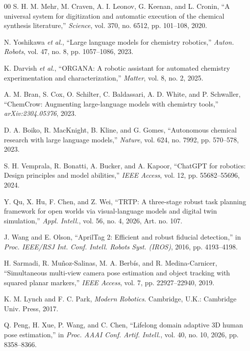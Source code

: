 \documentclass{ieeeaccess}
\newif\ifhighlight
\newcommand{\rev}[1]{\ifhighlight\hl{#1}\else#1\fi}
\begin{document}
\begin{thebibliography}{00}
 S. H. M. Mehr, M. Craven, A. I. Leonov, G. Keenan, and L. Cronin, ``A universal system for digitization and automatic execution of the chemical synthesis literature,'' \emph{Science}, vol. 370, no. 6512, pp. 101--108, 2020.

 N. Yoshikawa \emph{et al.}, ``Large language models for chemistry robotics,'' \emph{Auton. Robots}, vol. 47, no. 8, pp. 1057--1086, 2023.

 K. Darvish \emph{et al.}, ``ORGANA: A robotic assistant for automated chemistry experimentation and characterization,'' \emph{Matter}, vol. 8, no. 2, 2025.

 A. M. Bran, S. Cox, O. Schilter, C. Baldassari, A. D. White, and P. Schwaller, ``ChemCrow: Augmenting large-language models with chemistry tools,'' \emph{arXiv:2304.05376}, 2023.

 D. A. Boiko, R. MacKnight, B. Kline, and G. Gomes, ``Autonomous chemical research with large language models,'' \emph{Nature}, vol. 624, no. 7992, pp. 570--578, 2023.

 S. H. Vemprala, R. Bonatti, A. Bucker, and A. Kapoor, ``ChatGPT for robotics: Design principles and model abilities,'' \emph{IEEE Access}, vol. 12, pp. 55682--55696, 2024.

 Y. Qu, X. Hu, F. Chen, and Z. Wei, ``TRTP: A three-stage robust task planning framework for open worlds via visual-language models and digital twin simulation,'' \emph{Appl. Intell.}, vol. 56, no. 4, 2026, Art. no. 107.

 J. Wang and E. Olson, ``AprilTag 2: Efficient and robust fiducial detection,'' in \emph{Proc. IEEE/RSJ Int. Conf. Intell. Robots Syst. (IROS)}, 2016, pp. 4193--4198.

 H. Sarmadi, R. Mu\~noz-Salinas, M. A. Berb\'is, and R. Medina-Carnicer, ``Simultaneous multi-view camera pose estimation and object tracking with squared planar markers,'' \emph{IEEE Access}, vol. 7, pp. 22927--22940, 2019.

 K. M. Lynch and F. C. Park, \emph{Modern Robotics}. Cambridge, U.K.: Cambridge Univ. Press, 2017.

 \rev{Q. Peng, H. Xue, P. Wang, and C. Chen, ``Lifelong domain adaptive 3D human pose estimation,'' in \emph{Proc. AAAI Conf. Artif. Intell.}, vol. 40, no. 10, 2026, pp. 8358--8366.}

\end{thebibliography}
\end{document}

